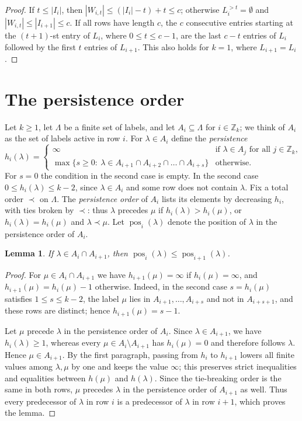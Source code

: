 \documentclass[11pt]{amsart}
\newtheorem{lemma}[theorem]{Lemma}
\theoremstyle{definition}
\theoremstyle{remark}
\numberwithin{equation}{section}
\newcommand{\Z}{\mathbb{Z}}
\newcommand{\pos}{\operatorname{pos}}
\begin{document}
\begin{proof}
If $t\le|I_i|$, then $|W_{i,t}|\le(|I_i|-t)+t\le c$; otherwise $L_i^{>t}=\emptyset$ and $|W_{i,t}|\le|I_{i+1}|\le c$. If all rows have length $c$, the $c$ consecutive entries starting at the $(t+1)$-st entry of $L_i$, where $0\le t\le c-1$, are the last $c-t$ entries of $L_i$ followed by the first $t$ entries of $L_{i+1}$. This also holds for $k=1$, where $L_{i+1}=L_i$.
\end{proof}


\section{The persistence order}\label{sec:persistence}

Let $k\ge1$, let $\Lambda$ be a finite set of labels, and let $A_i\subseteq\Lambda$ for $i\in\Z_k$; we think of $A_i$ as the set of labels active in row $i$. For $\lambda\in A_i$ define the \emph{persistence}
\[
h_i(\lambda)=
\begin{cases}
\infty & \text{if $\lambda\in A_j$ for all $j\in\Z_k$},\\
\max\{s\ge0:\ \lambda\in A_{i+1}\cap A_{i+2}\cap\dots\cap A_{i+s}\} & \text{otherwise}.
\end{cases}
\]
For $s=0$ the condition in the second case is empty. In the second case $0\le h_i(\lambda)\le k-2$, since $\lambda\in A_i$ and some row does not contain $\lambda$. Fix a total order $\prec$ on $\Lambda$. The \emph{persistence order} of $A_i$ lists its elements by decreasing $h_i$, with ties broken by $\prec$: thus $\lambda$ precedes $\mu$ if $h_i(\lambda)>h_i(\mu)$, or $h_i(\lambda)=h_i(\mu)$ and $\lambda\prec\mu$. Let $\pos_i(\lambda)$ denote the position of $\lambda$ in the persistence order of $A_i$.

\begin{lemma}\label{lem:monotone}
If $\lambda\in A_i\cap A_{i+1}$, then $\pos_i(\lambda)\le\pos_{i+1}(\lambda)$.
\end{lemma}

\begin{proof}
For $\mu\in A_i\cap A_{i+1}$ we have $h_{i+1}(\mu)=\infty$ if $h_i(\mu)=\infty$, and $h_{i+1}(\mu)=h_i(\mu)-1$ otherwise. Indeed, in the second case $s=h_i(\mu)$ satisfies $1\le s\le k-2$, the label $\mu$ lies in $A_{i+1},\dots,A_{i+s}$ and not in $A_{i+s+1}$, and these rows are distinct; hence $h_{i+1}(\mu)=s-1$.

Let $\mu$ precede $\lambda$ in the persistence order of $A_i$. Since $\lambda\in A_{i+1}$, we have $h_i(\lambda)\ge1$, whereas every $\mu\in A_i\setminus A_{i+1}$ has $h_i(\mu)=0$ and therefore follows $\lambda$. Hence $\mu\in A_{i+1}$. By the first paragraph, passing from $h_i$ to $h_{i+1}$ lowers all finite values among $\lambda,\mu$ by one and keeps the value $\infty$; this preserves strict inequalities and equalities between $h(\mu)$ and $h(\lambda)$. Since the tie-breaking order is the same in both rows, $\mu$ precedes $\lambda$ in the persistence order of $A_{i+1}$ as well. Thus every predecessor of $\lambda$ in row $i$ is a predecessor of $\lambda$ in row $i+1$, which proves the lemma.
\end{proof}
\end{document}
